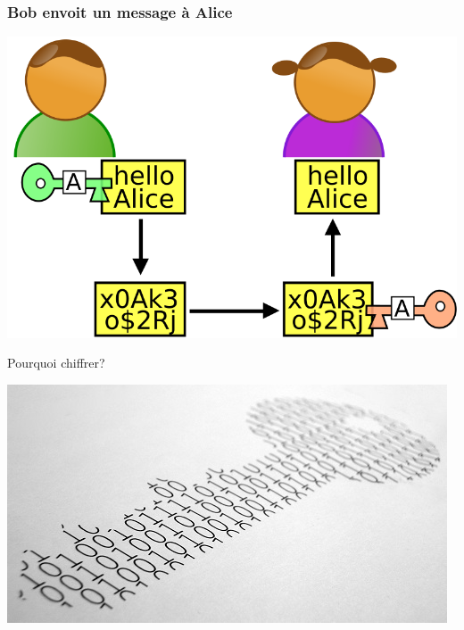 \documentclass{beamer}
\begin{document}
\begin{frame}
\frametitle{Bob envoit un message à Alice}
\begin{center}
\includegraphics[scale=0.4] {./Illustrations/Alice_et_bob.png} 
\end{center}
\end{frame}


\begin{frame}
\Huge{\centerline{Pourquoi chiffrer?}}
\begin{center}
\includegraphics[scale=0.4] {./Illustrations/cryptography.jpg} 
\end{center}
\end{frame}
\end{document}
